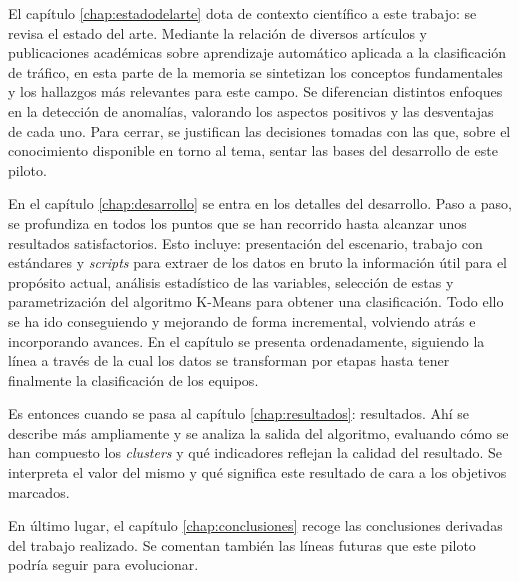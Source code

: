 El capítulo \ref{chap:estadodelarte} dota de contexto científico a este trabajo: se revisa el estado del arte.
Mediante la relación de diversos artículos y publicaciones académicas sobre aprendizaje automático aplicada a la clasificación de tráfico,
en esta parte de la memoria se sintetizan los conceptos fundamentales y los hallazgos más relevantes para este campo.
Se diferencian distintos enfoques en la detección de anomalías, valorando los aspectos positivos y las desventajas de cada uno.
Para cerrar, se justifican las decisiones tomadas con las que, sobre el conocimiento disponible en torno al tema, sentar las bases del desarrollo de este piloto.

En el capítulo \ref{chap:desarrollo} se entra en los detalles del desarrollo.
Paso a paso, se profundiza en todos los puntos que se han recorrido hasta alcanzar unos resultados satisfactorios.
Esto incluye: presentación del escenario, trabajo con estándares y \emph{scripts} para extraer de los datos en bruto la información útil para el propósito actual,
análisis estadístico de las variables, selección de estas y parametrización del algoritmo K-Means para obtener una clasificación.
Todo ello se ha ido conseguiendo y mejorando de forma incremental, volviendo atrás e incorporando avances.
En el capítulo se presenta ordenadamente, siguiendo la línea a través de la cual los datos se transforman por etapas hasta tener finalmente la clasificación de los equipos.

Es entonces cuando se pasa al capítulo \ref{chap:resultados}: resultados.
Ahí se describe más ampliamente y se analiza la salida del algoritmo, evaluando cómo se han compuesto los \emph{clusters} y qué indicadores reflejan la calidad del resultado.
Se interpreta el valor del mismo y qué significa este resultado de cara a los objetivos marcados.

En último lugar, el capítulo \ref{chap:conclusiones} recoge las conclusiones derivadas del trabajo realizado.
Se comentan también las líneas futuras que este piloto podría seguir para evolucionar.
